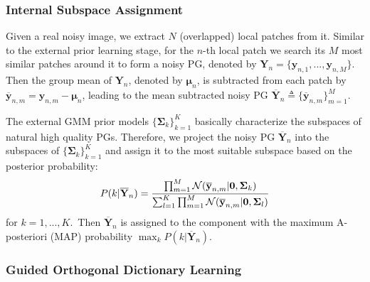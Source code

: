 \documentclass[10pt,twocolumn,letterpaper]{article}
\begin{document}
\subsubsection{Internal Subspace Assignment}

Given a real noisy image, we extract $N$ (overlapped) local patches from it. Similar to the external prior learning stage, for the $n$-th local patch we search its $M$ most similar patches around it to form a noisy PG, denoted by $\mathbf{Y}_{n} = \{\mathbf{y}_{n,1},...,\mathbf{y}_{n,M}\}$. Then the group mean of $\mathbf{Y}_{n}$, denoted by $\bm{\mu}_{n}$, is subtracted from each patch by $\mathbf{\overline{y}}_{n,m}=\mathbf{y}_{n,m}-\bm{\mu}_{n}$, leading to the mean subtracted noisy PG $\mathbf{\overline{Y}}_{n}\triangleq \{\mathbf{\overline{y}}_{n,m}\}_{m=1}^{M}$.

The external GMM prior models $\{\mathbf{\Sigma}_{k}\}_{k=1}^{K}$ basically characterize the subspaces of natural high quality PGs. Therefore, we project the noisy PG $\mathbf{\overline{Y}}_{n}$ into the subspaces of $\{\mathbf{\Sigma}_{k}\}_{k=1}^{K}$ and assign it to the most suitable subspace based on the posterior probability:
\vspace{-2mm}
\begin{equation}\label{equ3}\vspace{-2mm}
P(k|\mathbf{\overline{Y}}_{n})=\frac{\prod_{m=1}^{M}\mathcal{N}(\mathbf{\overline{y}}_{n,m}|\mathbf{0},\mathbf{\Sigma}_{k})}{\sum_{l=1}^{K}\prod_{m=1}^{M}\mathcal{N}(\mathbf{\overline{y}}_{n,m}|\mathbf{0},\mathbf{\Sigma}_{l})}
\end{equation}
for $k=1,...,K$.\ Then $\mathbf{\overline{Y}}_{n}$ is assigned to the component with the maximum A-posteriori (MAP) probability $\max_{k}P(k|\mathbf{\overline{Y}}_{n})$.


\subsubsection{Guided Orthogonal Dictionary Learning}
\end{document}
